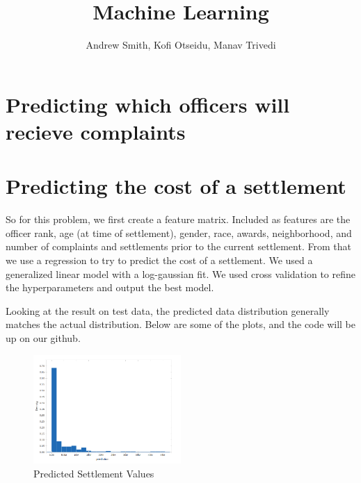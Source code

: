 \documentclass[11pt]{article}
\author{Andrew Smith, Kofi Otseidu, Manav Trivedi}
\title{Machine Learning}
\begin{document}
\maketitle

\section{Predicting which officers will recieve complaints}

\section{Predicting the cost of a settlement}
So for this problem, we first create a feature matrix. Included as features are the officer rank, age (at time of settlement), gender, race, awards, neighborhood, and number of complaints and settlements prior to the current settlement. From that we use a regression to try to predict the cost of a settlement. We used a generalized linear model with a log-gaussian fit. We used cross validation to refine the hyperparameters and output the best model.

Looking at the result on test data, the predicted data distribution generally matches the actual distribution. Below are some of the plots, and the code will be up on our github.

\begin{figure}[h]
\centering
\caption{Predicted Settlement Values}
\includegraphics[width=0.5\textwidth]{predicted.png}
\end{figure}
\end{document}
